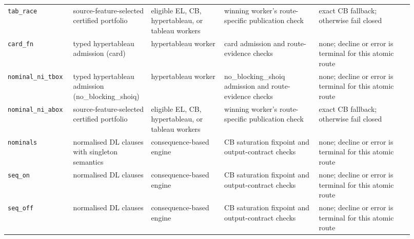 \begin{longtable}{@{}p{0.13\linewidth}p{0.18\linewidth}p{0.17\linewidth}p{0.22\linewidth}p{0.22\linewidth}@{}}
\texttt{tab\_race} & source-feature-selected certified portfolio & eligible EL, CB, hypertableau, or tableau workers & winning worker's route-specific publication check & exact CB fallback; otherwise fail closed \\
\texttt{card\_fn} & typed hypertableau admission (card) & hypertableau worker & card admission and route-evidence checks & none; decline or error is terminal for this atomic route \\
\texttt{nominal\_ni\_tbox} & typed hypertableau admission (no\_blocking\_shoiq) & hypertableau worker & no\_blocking\_shoiq admission and route-evidence checks & none; decline or error is terminal for this atomic route \\
\texttt{nominal\_ni\_abox} & source-feature-selected certified portfolio & eligible EL, CB, hypertableau, or tableau workers & winning worker's route-specific publication check & exact CB fallback; otherwise fail closed \\
\texttt{nominals} & normalised DL clauses with singleton semantics & consequence-based engine & CB saturation fixpoint and output-contract checks & none; decline or error is terminal for this atomic route \\
\texttt{seq\_on} & normalised DL clauses & consequence-based engine & CB saturation fixpoint and output-contract checks & none; decline or error is terminal for this atomic route \\
\texttt{seq\_off} & normalised DL clauses & consequence-based engine & CB saturation fixpoint and output-contract checks & none; decline or error is terminal for this atomic route \\
\bottomrule
\end{longtable}
\endgroup

